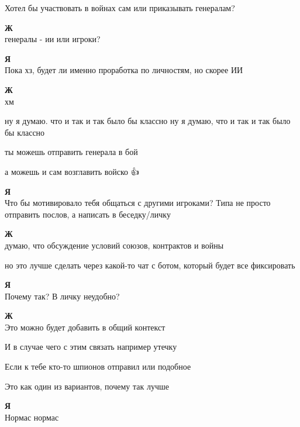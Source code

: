 \begin{tabbing}
Хотел бы участвовать в войнах сам или приказывать генералам?

\textbf{Ж} \\
генералы - ии или игроки?

\textbf{Я} \\
Пока хз, будет ли именно проработка по личностям, но скорее ИИ

\textbf{Ж} \\
хм

ну я думаю. что и так и так было бы классно
ну я думаю, что и так и так было бы классно

ты можешь отправить генерала в бой

а можешь и сам возглавить войско 👍🎅

\textbf{Я} \\
Что бы мотивировало тебя общаться с другими игроками? Типа не просто отправить послов, а написать в беседку/личку

\textbf{Ж} \\
думаю, что обсуждение условий союзов, контрактов и войны

но это лучше сделать через какой-то чат с ботом, который будет все фиксировать

\textbf{Я} \\
Почему так? В личку неудобно?

\textbf{Ж} \\
Это можно будет добавить в общий контекст

И в случае чего с этим связать например утечку

Если к тебе кто-то шпионов отправил или подобное

Это как один из вариантов, почему так лучше

\textbf{Я} \\
Нормас нормас
\end{tabbing}